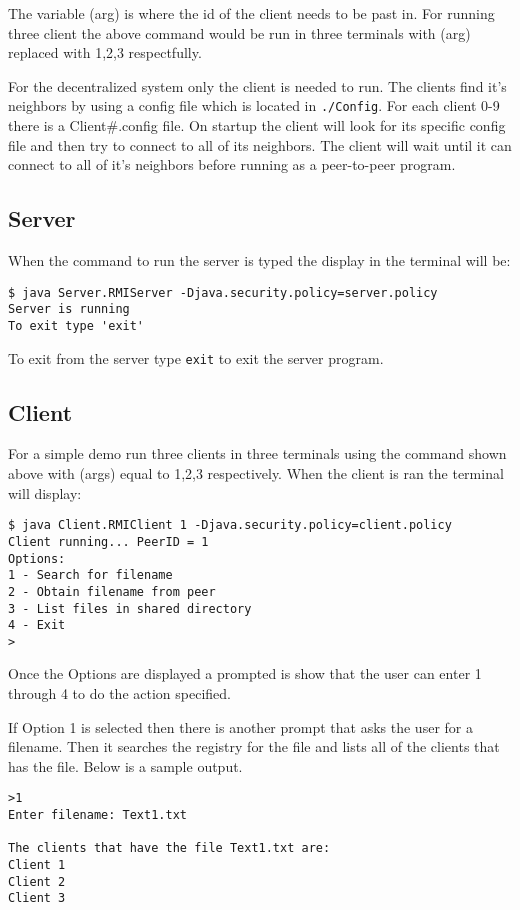 \documentclass{article}
\begin{document}
The variable (arg) is where the id of the client needs to be past in. For running three client the above command would be run in three terminals with (arg) replaced with 1,2,3 respectfully. 

For the decentralized system only the client is needed to run. The clients find it's neighbors by using a config file which is located in \texttt{./Config}. For each client 0-9 there is a Client\#.config file. On startup the client will look for its specific config file and then try to connect to all of its neighbors. The client will wait until it can connect to all of it's neighbors before running as a peer-to-peer program.


\subsection*{Server} 
When the command to run the server is typed the display in the terminal will be:

\begin{verbatim}
$ java Server.RMIServer -Djava.security.policy=server.policy
Server is running
To exit type 'exit'
\end{verbatim}

To exit from the server type \texttt{exit} to exit the server program. 

\subsection*{Client}
For a simple demo run three clients in three terminals using the command shown above with (args) equal to 1,2,3 respectively. When the client is ran the terminal will display:

\begin{verbatim}
$ java Client.RMIClient 1 -Djava.security.policy=client.policy
Client running... PeerID = 1
Options:
1 - Search for filename
2 - Obtain filename from peer
3 - List files in shared directory
4 - Exit
>
\end{verbatim}

Once the Options are displayed a prompted is show that the user can enter 1 through 4 to do the action specified. 

If Option 1 is selected then there is another prompt that asks the user for a filename. Then it searches the registry for the file and lists all of the clients that has the file. Below is a sample output. 

\begin{verbatim}
>1
Enter filename: Text1.txt

The clients that have the file Text1.txt are:
Client 1
Client 2
Client 3
\end{verbatim}
\end{document}
